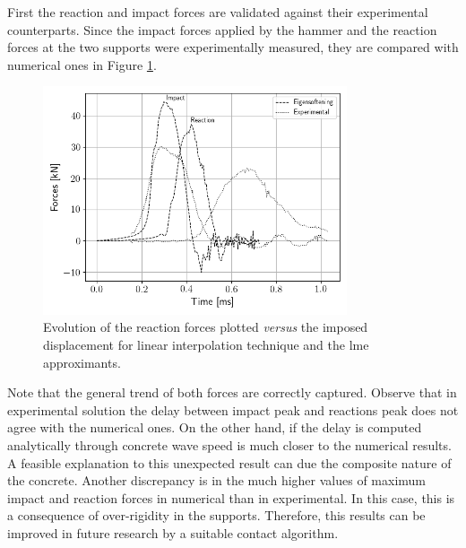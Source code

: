 \documentclass[preprint,12pt,a4paper]{elsarticle}
\begin{document}
First the reaction and impact forces are validated against their
experimental counterparts. Since the impact forces applied by the
hammer and the reaction forces at the two supports were experimentally
measured, they are compared with numerical ones in Figure
\ref{fig:Reactions-Forces-impact-test}. 
\begin{figure}
  \centering
  \includegraphics[width=0.8\textwidth]{Figure-impact-test-Forces-Time}
  \caption{Evolution of the reaction forces plotted \textit{versus}
    the imposed displacement for linear interpolation technique and
    the \acrshort{lme} approximants.}
  \label{fig:Reactions-Forces-impact-test}
\end{figure}
Note that the general trend of both forces are correctly
captured. Observe that in experimental solution the delay between
impact peak and reactions peak does not agree with the numerical
ones. On the other hand, if the delay is computed analytically through
concrete wave speed is much closer to the numerical results. A
feasible explanation to this unexpected result can due the composite
nature of the concrete. Another discrepancy is in the much higher
values of maximum impact and reaction forces in numerical than in
experimental. In this case, this is a consequence of over-rigidity
in the supports. Therefore, this results can be improved in future research
by a suitable contact algorithm.\\
\end{document}
